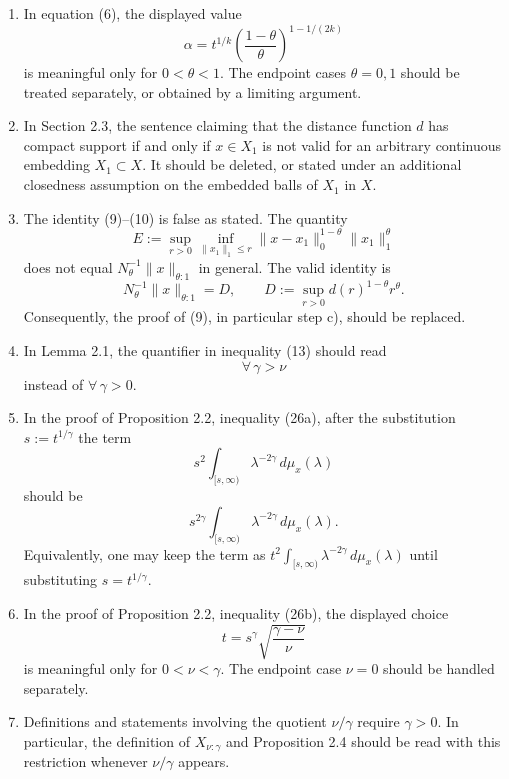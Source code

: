 \documentclass[10pt,a4paper]{article}
\newcommand{\norm}[2]{     \| #1       \|_{ #2 }}
\begin{document}
\begin{enumerate}

\item[\textup{(E1)}]
In equation (6), the displayed value
\[
    \alpha
    =
    t^{1/k}
    \left(\frac{1-\theta}{\theta}\right)^{1-1/(2k)}
\]
is meaningful only for $0<\theta<1$.  The endpoint cases $\theta=0,1$ should be treated separately, or obtained by a limiting argument.

\item[\textup{(E2)}]
In Section 2.3, the sentence claiming that the distance function $d$ has compact support if and only if $x\in X_1$ is not valid for an arbitrary continuous embedding $X_1\subset X$.  It should be deleted, or stated under an additional closedness assumption on the embedded balls of $X_1$ in $X$.

\item[\textup{(E3)}]
The identity (9)--(10) is false as stated.  The quantity
\[
    E
    :=
    \sup_{r>0}
    \inf_{\norm{x_1}{1}\le r}
    \norm{x-x_1}{0}^{1-\theta}
    \norm{x_1}{1}^{\theta}
\]
does not equal $N_\theta^{-1}\norm{x}{\theta:1}$ in general.  The valid identity is
\[
    N_\theta^{-1}\norm{x}{\theta:1}
    =
    D,
    \qquad
    D:=\sup_{r>0}d(r)^{1-\theta}r^\theta .
\]
Consequently, the proof of (9), in particular step c), should be replaced.

\item[\textup{(E4)}]
In Lemma 2.1, the quantifier in inequality (13) should read
\[
    \forall\,\gamma>\nu
\]
instead of $\forall\,\gamma>0$.

\item[\textup{(E5)}]
In the proof of Proposition 2.2, inequality (26a), after the substitution $s:=t^{1/\gamma}$ the term
\[
    s^2\int_{[s,\infty)}\lambda^{-2\gamma}\,d\mu_x(\lambda)
\]
should be
\[
    s^{2\gamma}\int_{[s,\infty)}\lambda^{-2\gamma}\,d\mu_x(\lambda).
\]
Equivalently, one may keep the term as $t^2\int_{[s,\infty)}\lambda^{-2\gamma}\,d\mu_x(\lambda)$ until substituting $s=t^{1/\gamma}$.

\item[\textup{(E6)}]
In the proof of Proposition 2.2, inequality (26b), the displayed choice
\[
    t=s^\gamma\sqrt{\frac{\gamma-\nu}{\nu}}
\]
is meaningful only for $0<\nu<\gamma$.  The endpoint case $\nu=0$ should be handled separately.

\item[\textup{(E7)}]
Definitions and statements involving the quotient $\nu/\gamma$ require $\gamma>0$.  In particular, the definition of $X_{\nu:\gamma}$ and Proposition 2.4 should be read with this restriction whenever $\nu/\gamma$ appears.


\end{enumerate}
\end{document}
